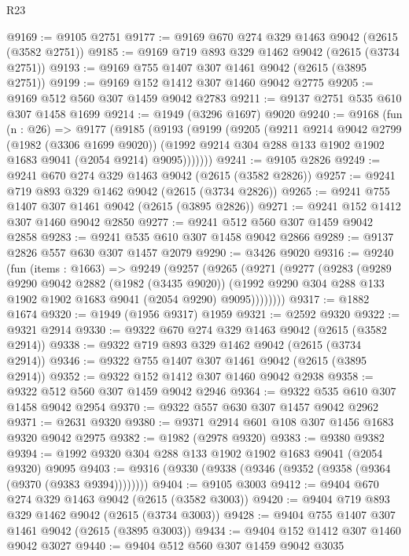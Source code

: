 \begin{lexlean}{R23}
\begin{coremodule}
@9169 := @9105 @2751
@9177 := @9169 @670 @274 @329 @1463 @9042 (@2615 (@3582 @2751))
@9185 := @9169 @719 @893 @329 @1462 @9042 (@2615 (@3734 @2751))
@9193 := @9169 @755 @1407 @307 @1461 @9042 (@2615 (@3895 @2751))
@9199 := @9169 @152 @1412 @307 @1460 @9042 @2775
@9205 := @9169 @512 @560 @307 @1459 @9042 @2783
@9211 := @9137 @2751 @535 @610 @307 @1458 @1699
@9214 := @1949 (@3296 @1697) @9020
@9240 := @9168
    (fun (n : @26) =>
    @9177
      (@9185
        (@9193
          (@9199
            (@9205
              (@9211
                @9214
                @9042
                @2799
                (@1982 (@3306 @1699 @9020))
                (@1992 @9214 @304 @288 @133 @1902 @1902 @1683 @9041 (@2054 @9214) @9095)))))))
@9241 := @9105 @2826
@9249 := @9241 @670 @274 @329 @1463 @9042 (@2615 (@3582 @2826))
@9257 := @9241 @719 @893 @329 @1462 @9042 (@2615 (@3734 @2826))
@9265 := @9241 @755 @1407 @307 @1461 @9042 (@2615 (@3895 @2826))
@9271 := @9241 @152 @1412 @307 @1460 @9042 @2850
@9277 := @9241 @512 @560 @307 @1459 @9042 @2858
@9283 := @9241 @535 @610 @307 @1458 @9042 @2866
@9289 := @9137 @2826 @557 @630 @307 @1457 @2079
@9290 := @3426 @9020
@9316 := @9240
    (fun (items : @1663) =>
    @9249
      (@9257
        (@9265
          (@9271
            (@9277
              (@9283
                (@9289
                  @9290
                  @9042
                  @2882
                  (@1982 (@3435 @9020))
                  (@1992 @9290 @304 @288 @133 @1902 @1902 @1683 @9041 (@2054 @9290) @9095))))))))
@9317 := @1882 @1674
@9320 := @1949 (@1956 @9317) @1959
@9321 := @2592 @9320
@9322 := @9321 @2914
@9330 := @9322 @670 @274 @329 @1463 @9042 (@2615 (@3582 @2914))
@9338 := @9322 @719 @893 @329 @1462 @9042 (@2615 (@3734 @2914))
@9346 := @9322 @755 @1407 @307 @1461 @9042 (@2615 (@3895 @2914))
@9352 := @9322 @152 @1412 @307 @1460 @9042 @2938
@9358 := @9322 @512 @560 @307 @1459 @9042 @2946
@9364 := @9322 @535 @610 @307 @1458 @9042 @2954
@9370 := @9322 @557 @630 @307 @1457 @9042 @2962
@9371 := @2631 @9320
@9380 := @9371 @2914 @601 @108 @307 @1456 @1683 @9320 @9042 @2975
@9382 := @1982 (@2978 @9320)
@9383 := @9380 @9382
@9394 := @1992 @9320 @304 @288 @133 @1902 @1902 @1683 @9041 (@2054 @9320) @9095
@9403 := @9316 (@9330 (@9338 (@9346 (@9352 (@9358 (@9364 (@9370 (@9383 @9394))))))))
@9404 := @9105 @3003
@9412 := @9404 @670 @274 @329 @1463 @9042 (@2615 (@3582 @3003))
@9420 := @9404 @719 @893 @329 @1462 @9042 (@2615 (@3734 @3003))
@9428 := @9404 @755 @1407 @307 @1461 @9042 (@2615 (@3895 @3003))
@9434 := @9404 @152 @1412 @307 @1460 @9042 @3027
@9440 := @9404 @512 @560 @307 @1459 @9042 @3035

\end{coremodule}
\end{lexlean}
